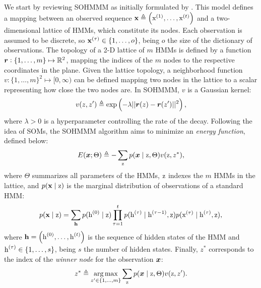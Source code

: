 We start by reviewing SOHMMM as initially formulated by \citet{Ferles2008}. This model defines a mapping between an observed sequence ${\mathbf{x}} \triangleq \left({\textnormal{x}}^{(1)}, \dots, {\textnormal{x}}^{(t)} \right)$ and a two-dimensional lattice of HMMs, which constitute its nodes. Each observation is assumed to be discrete, so ${\mathbf{x}}^{(\tau)} \in \{1,\dots,o\}$, being $o$ the size of the dictionary of observations. The topology of a 2-D lattice of $m$ HMMs is defined by a function ${\bm{r}}: \{1, \dots, m\} \mapsto \mathbb{R}^2$, mapping the indices of the $m$ nodes to the respective coordinates in the plane. Given the lattice topology, a neighborhood function $v: \{1, \dots, m\}^2 \mapsto [0, \infty)$ can be defined mapping two nodes in the lattice to a scalar representing how close the two nodes are. In SOHMMM, $v$ is a Gaussian kernel:
\begin{equation}
\label{eq:sohmmm_distance}
v(z,z') \triangleq \exp\left(-\lambda||{\bm{r}}(z)-{\bm{r}}(z')||^{2}\right),
\end{equation}
where $\lambda > 0$ is a hyperparameter controlling the rate of the decay.
Following the idea of SOMs, the SOHMMM algorithm aims to minimize an \emph{energy function}, defined below:
\begin{equation}
\label{eq:sohmmm_energy}
E({\bm{x}}; \Theta) \triangleq -\sum_{{\textnormal{z}}} p({\bm{x}} \mid {\textnormal{z}}, \Theta)v({\textnormal{z}}, z^*),
\end{equation}
where $\Theta$ summarizes all parameters of the HMMs, ${\textnormal{z}}$ indexes the $m$ HMMs in the lattice, and $p({\mathbf{x}} \mid {\textnormal{z}})$ is the marginal distribution of observations of a standard HMM:
\begin{equation}
\label{eq:sohmmm_hmm}
p({\mathbf{x}} \mid {\textnormal{z}}) = \sum_{{\mathbf{h}}} p({\textnormal{h}}^{(0)} \mid {\textnormal{z}}) \prod_{\tau=1}^t p({\textnormal{h}}^{(\tau)} \mid {\textnormal{h}}^{(\tau-1)},{\textnormal{z}}) p({\textnormal{x}}^{(\tau)} \mid {\textnormal{h}}^{(\tau)},{\textnormal{z}}),
\end{equation}
where ${\mathbf{h}} = \left({\textnormal{h}}^{(0)},\dots,{\textnormal{h}}^{(t)}\right)$ is the sequence of hidden states of the HMM and ${\textnormal{h}}^{(\tau)} \in \{1, \dots, s\}$, being $s$ the number of hidden states. Finally, $z^*$ corresponds to the index of the \emph{winner node} for the observation ${\bm{x}}$:
\begin{equation}
\label{eq:sohmmm_winner}
z^* \triangleq \operatorname*{arg\,max}_{z' \in \{1,\dots,m\}} \sum_{{\textnormal{z}}} p({\bm{x}} \mid {\textnormal{z}}, \Theta)v({\textnormal{z}}, z').
\end{equation}

